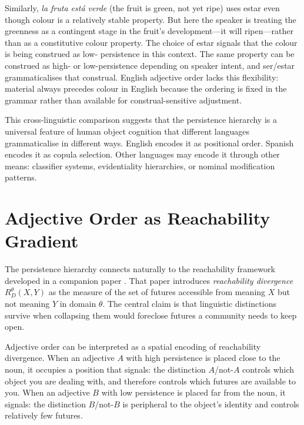 \documentclass[11pt]{article}
\theoremstyle{rthm}
\theoremstyle{rdef}
\theoremstyle{remark}
\newcommand{\RD}[1][\theta]{R_{D}^{#1}}
\begin{document}
Similarly, \emph{la fruta est\'a verde} (the fruit is green, not yet ripe)
uses estar even though colour is a relatively stable property. But here
the speaker is treating the greenness as a contingent stage in the fruit's
development---it will ripen---rather than as a constitutive colour property.
The choice of estar signals that the colour is being construed as low-
persistence in this context. The same property can be construed as high- or
low-persistence depending on speaker intent, and ser/estar grammaticalises
that construal. English adjective order lacks this flexibility: material
always precedes colour in English because the ordering is fixed in the
grammar rather than available for construal-sensitive adjustment.

This cross-linguistic comparison suggests that the persistence hierarchy is
a universal feature of human object cognition that different languages
grammaticalise in different ways. English encodes it as positional order.
Spanish encodes it as copula selection. Other languages may encode it
through other means: classifier systems, evidentiality hierarchies,
or nominal modification patterns.

\section{Adjective Order as Reachability Gradient}
\label{sec:reachability}

The persistence hierarchy connects naturally to the reachability framework
developed in a companion paper \cite{flyxion2026}. That paper introduces
\emph{reachability divergence} $\RD(X,Y)$ as the measure of the set of
futures accessible from meaning $X$ but not meaning $Y$ in domain $\theta$.
The central claim is that linguistic distinctions survive when collapsing
them would foreclose futures a community needs to keep open.

Adjective order can be interpreted as a spatial encoding of reachability
divergence. When an adjective $A$ with high persistence is placed close to
the noun, it occupies a position that signals: the distinction $A$/not-$A$
controls which object you are dealing with, and therefore controls which
futures are available to you. When an adjective $B$ with low persistence is
placed far from the noun, it signals: the distinction $B$/not-$B$ is
peripheral to the object's identity and controls relatively few futures.
\end{document}
